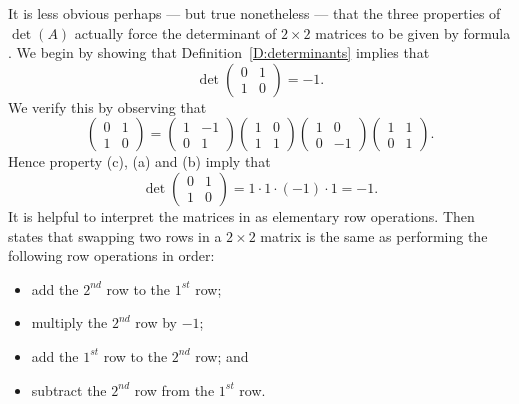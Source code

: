 It is less obvious perhaps --- but true nonetheless --- that the
three properties of $\det(A)$ actually force the determinant of
$2\times 2$ matrices to be given by formula
. We begin by showing that
Definition~\ref{D:determinants} implies that 
\begin{equation}  \label{e:detswap}
\det \left(\begin{array}{cc} 0 & 1\\1 & 0 \end{array}\right)=-1.
\end{equation}
We verify this by observing that 
\begin{equation} \label{e:swapdecomp}
\left(\begin{array}{cc} 0 & 1\\1 & 0 \end{array}\right) =
\left(\begin{array}{cr} 1 & -1\\0 & 1 \end{array}\right)
\left(\begin{array}{cc} 1 & 0\\1 & 1 \end{array}\right)
\left(\begin{array}{cr} 1 & 0\\0 & -1 \end{array}\right)
\left(\begin{array}{cc} 1 & 1\\0 & 1 \end{array}\right).
\end{equation}
Hence property (c), (a) and (b) imply that
\[
\det \left(\begin{array}{cc} 0 & 1\\1 & 0 \end{array}\right) =
1\cdot 1\cdot (-1) \cdot 1 = -1.
\]
It is helpful to interpret the matrices in  as
elementary row operations.  
Then  states that
swapping two rows in a $2\times 2$ matrix is the same as
performing the following row operations in order:
\begin{itemize}
\item        add the $2^{nd}$ row to the  $1^{st}$ row;
\item        multiply the $2^{nd}$ row by $-1$; 
\item        add the $1^{st}$ row to the $2^{nd}$ row; and  
\item        subtract the $2^{nd}$ row from the $1^{st}$ row.
\end{itemize}
 

